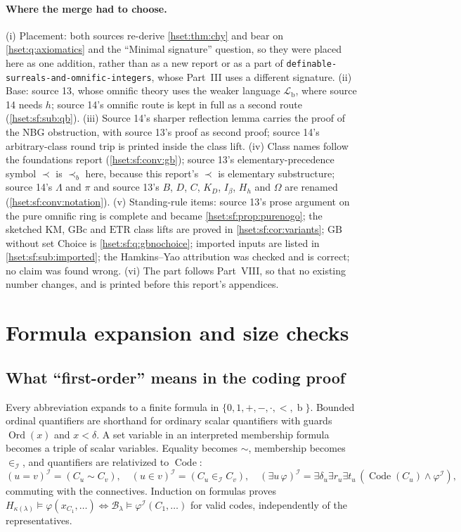 \documentclass[11pt,letterpaper]{article}
\theoremstyle{definition}
\theoremstyle{remark}
\newcommand{\Ord}{\operatorname{Ord}}
\newcommand{\bd}{\operatorname{b}}
\newcommand{\B}{\mathcal B}
\newcommand{\I}{\mathcal I}
\newcommand{\Code}{\operatorname{Code}}
\newcommand{\repo}[1]{\nolinkurl{#1}}
\newcommand{\GB}{\mathrm{GB}}
\newcommand{\GBc}{\mathrm{GBc}}
\newcommand{\ETR}{\mathrm{ETR}}
\newcommand{\precb}{\prec_b}
\newcommand{\Lb}{\mathcal L_{\mathrm b}}
\begin{document}
\paragraph{Where the merge had to choose.} (i) Placement: both sources re-derive
\cref{hset:thm:chy} and bear on \cref{hset:q:axiomatics} and the ``Minimal
signature'' question, so they were placed here as one addition, rather than as a new
report or as a part of \repo{definable-surreals-and-omnific-integers}, whose Part~III
uses a different signature. (ii) Base: source 13, whose omnific theory uses the weaker
language $\Lb$, where source 14 needs $h$; source 14's omnific route is kept in full as
a second route (\cref{hset:sf:sub:qb}). (iii) Source 14's sharper reflection lemma
carries the proof of the NBG obstruction, with source 13's proof as second proof;
source 14's arbitrary-class round trip is printed inside the class lift. (iv) Class
names follow the foundations report (\cref{hset:sf:conv:gb}); source 13's
elementary-precedence symbol $\prec$ is $\precb$ here, because this report's $\prec$ is
elementary substructure; source 14's $\Lambda$ and $\pi$ and source 13's $B$, $D$,
$C$, $K_D$, $I_\beta$, $H_h$ and $\Omega$ are renamed (\cref{hset:sf:conv:notation}).
(v) Standing-rule items: source 13's prose argument on the pure omnific ring is
complete and became \cref{hset:sf:prop:purenogo}; the sketched KM, $\GBc$ and $\ETR$
class lifts are proved in \cref{hset:sf:cor:variants}; $\GB$ without set Choice is
\cref{hset:sf:q:gbnochoice}; imported inputs are listed in
\cref{hset:sf:sub:imported}; the Hamkins--Yao attribution was checked and is
correct; no claim was found wrong. (vi) The part follows Part~VIII, so that no
existing number changes, and is printed before this report's appendices.

\appendix
\section{Formula expansion and size checks}
\label{hset:app:formulas}

\subsection{What ``first-order'' means in the coding proof}

Every abbreviation expands to a finite formula in
$\{0,1,+,-,\cdot,<,\bd\}$. Bounded ordinal quantifiers are shorthand for
ordinary scalar quantifiers with guards $\Ord(x)$ and $x<\delta$. A set variable
in an interpreted membership formula becomes a triple of scalar variables.
Equality becomes $\sim$, membership becomes $\in_\I$, and quantifiers are
relativized to $\Code$:
\[
 (u=v)^\I=(C_u\sim C_v),\quad (u\in v)^\I=(C_u\in_\I C_v),\quad
 (\exists u\,\varphi)^\I=\exists\delta_u\exists r_u\exists t_u\,
 (\Code(C_u)\land\varphi^\I),
\]
commuting with the connectives. Induction on formulas proves
$H_{\kappa(\lambda)}\models\varphi(x_{C_1},\dots)\iff\B_\lambda\models
\varphi^\I(C_1,\dots)$ for valid codes, independently of the representatives.
\end{document}
